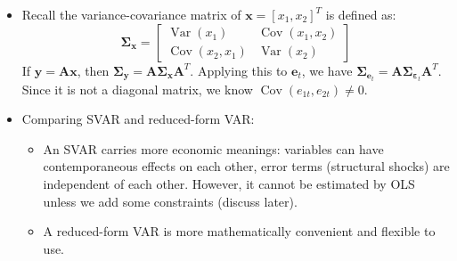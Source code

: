 \documentclass[notitlepage]{article}
\DeclareMathOperator{\Var}{Var}
\DeclareMathOperator{\Cov}{Cov}
\begin{document}
\begin{itemize}
\begin{align*}
    \end{align*}
    We can denote this as:
    \begin{align*}
        \mathbf{A}_0\mathbf{y}_t &= \mathbf{c} + \boldsymbol{\Psi}\mathbf{y}_{t-1} + \boldsymbol{\varepsilon}_t \\
        \mathbf{y}_t &= \mathbf{A}_0^{-1}\mathbf{c} + \mathbf{A}_0^{-1}\boldsymbol{\Psi}\mathbf{y}_{t-1} + \mathbf{A}_0^{-1}\boldsymbol{\varepsilon}_t
    \end{align*}
    Let \(\mathbf{A} = \mathbf{A}_0^{-1}\), then we have \(\mathbf{e}_t = \mathbf{A}\boldsymbol{\varepsilon}_t\).

    \item Recall the variance-covariance matrix of \(\mathbf{x} = [x_1, x_2]^T\) is defined as:
    \[
    \boldsymbol{\Sigma}_\mathbf{x} = \begin{bmatrix} \Var(x_1) & \Cov(x_1, x_2) \\ \Cov(x_2, x_1) & \Var(x_2) \end{bmatrix}
    \]
    If \(\mathbf{y} = \mathbf{A}\mathbf{x}\), then \(\boldsymbol{\Sigma}_\mathbf{y} = \mathbf{A}\boldsymbol{\Sigma}_\mathbf{x}\mathbf{A}^{T}\). Applying this to \(\mathbf{e}_t\), we have \(\boldsymbol{\Sigma}_{\mathbf{e}_t} = \mathbf{A}\boldsymbol{\Sigma}_{\boldsymbol{\varepsilon}_t}\mathbf{A}^{T}\). Since it is not a diagonal matrix, we know \(\Cov(e_{1t}, e_{2t}) \ne 0\).

    \item Comparing SVAR and reduced-form VAR:
    \begin{itemize}
        \item An SVAR carries more economic meanings: variables can have contemporaneous effects on each other, error terms (structural shocks) are independent of each other. However, it cannot be estimated by OLS unless we add some constraints (discuss later).
        \item A reduced-form VAR is more mathematically convenient and flexible to use.
    \end{itemize}


\end{itemize}
\end{document}
